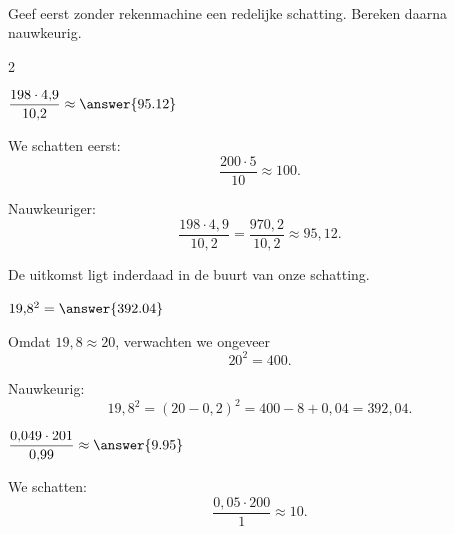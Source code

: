 \documentclass{ximera}
\begin{document}
            \begin{oefening}{\oefU\ESS}
                \\
                
                Geef eerst zonder rekenmachine een redelijke schatting. Bereken daarna nauwkeurig.
                
                \begin{multicols}{2}
                
                \begin{question}
                $\dfrac{198\cdot4{,}9}{10{,}2}\approx\answer{95.12}$
                
                \begin{oplossing}
                We schatten eerst:
                \[
                \dfrac{200\cdot5}{10}\approx100.
                \]
                
                Nauwkeuriger:
                \[
                \dfrac{198\cdot4{,}9}{10{,}2}
                =\dfrac{970{,}2}{10{,}2}
                \approx95{,}12.
                \]
                
                De uitkomst ligt inderdaad in de buurt van onze schatting.
                \end{oplossing}
                \end{question}
                
                
                \begin{question}
                $19{,}8^2=\answer{392.04}$
                
                \begin{oplossing}
                Omdat $19{,}8\approx20$, verwachten we ongeveer
                \[
                20^2=400.
                \]
                
                Nauwkeurig:
                \[
                19{,}8^2
                =(20-0{,}2)^2
                =400-8+0{,}04
                =392{,}04.
                \]
                \end{oplossing}
                \end{question}
                
                
                \begin{question}
                $\dfrac{0{,}049\cdot201}{0{,}99}\approx\answer{9.95}$
                
                \begin{oplossing}
                We schatten:
                \[
                \dfrac{0{,}05\cdot200}{1}\approx10.
                \]
                

\end{oplossing}
\end{question}
\end{multicols}
\end{oefening}
\end{document}
